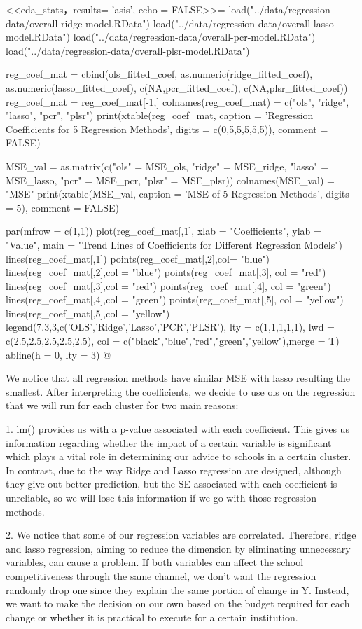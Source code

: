 \documentclass{article}
\begin{document}
<<eda_stats，results= 'asis', echo = FALSE>>=
load("../data/regression-data/overall-ridge-model.RData")
load("../data/regression-data/overall-lasso-model.RData")
load("../data/regression-data/overall-pcr-model.RData")
load("../data/regression-data/overall-plsr-model.RData")

reg_coef_mat = cbind(ols_fitted_coef, as.numeric(ridge_fitted_coef), as.numeric(lasso_fitted_coef), c(NA,pcr_fitted_coef), c(NA,plsr_fitted_coef))
reg_coef_mat = reg_coef_mat[-1,]
colnames(reg_coef_mat) = c("ols", "ridge", "lasso", "pcr", "plsr")
print(xtable(reg_coef_mat, caption = 'Regression Coefficients for 5 Regression Methods', digits = c(0,5,5,5,5,5)), comment = FALSE)

MSE_val = as.matrix(c("ols" = MSE_ols, "ridge" = MSE_ridge, "lasso" = MSE_lasso, "pcr" = MSE_pcr, "plsr" = MSE_plsr))
colnames(MSE_val) = "MSE"
print(xtable(MSE_val, caption = 'MSE of 5 Regression Methods', digits = 5), comment = FALSE)

par(mfrow = c(1,1))
plot(reg_coef_mat[,1], xlab = "Coefficients", ylab = "Value", main = "Trend Lines of Coefficients for Different Regression Models")
lines(reg_coef_mat[,1])
points(reg_coef_mat[,2],col= "blue")
lines(reg_coef_mat[,2],col = "blue")
points(reg_coef_mat[,3], col = "red")
lines(reg_coef_mat[,3],col = "red")
points(reg_coef_mat[,4], col = "green")
lines(reg_coef_mat[,4],col = "green")
points(reg_coef_mat[,5], col = "yellow")
lines(reg_coef_mat[,5],col = "yellow")
legend(7.3,3,c('OLS','Ridge','Lasso','PCR','PLSR'), lty = c(1,1,1,1,1), lwd = c(2.5,2.5,2.5,2.5,2.5), col = c("black","blue","red","green","yellow"),merge = T)
abline(h = 0, lty = 3)
@

We notice that all regression methods have similar MSE with lasso resulting the smallest. After interpreting the coefficients, we decide to use ols on the regression that we will run for each cluster for two main reasons:

1. lm() provides us with a p-value associated with each coefficient. This gives us information regarding whether the impact of a certain variable is significant which plays a vital role in determining our advice to schools in a certain cluster. In contrast, due to the way Ridge and Lasso regression are designed, although they give out better prediction, but the SE associated with each coefficient is unreliable, so we will lose this information if we go with those regression methods.

2. We notice that some of our regression variables are correlated. Therefore, ridge and lasso regression, aiming to reduce the dimension by eliminating unnecessary variables, can cause a problem. If both variables can affect the school competitiveness through the same channel, we don't want the regression randomly drop one since they explain the same portion of change in Y. Instead, we want to make the decision on our own based on the budget required for each change or whether it is practical to execute for a certain institution.
\end{document}
